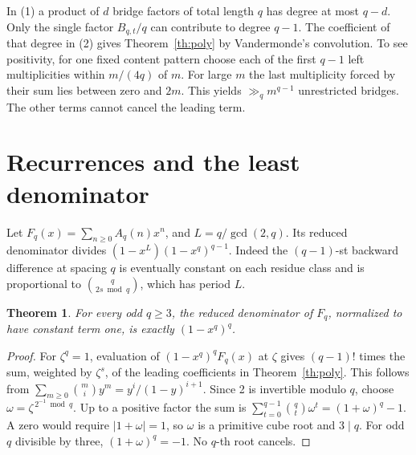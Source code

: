 \documentclass[11pt,letterpaper]{article}
\newtheorem{theorem}{Theorem}
\begin{document}
In (1) a product of \(d\) bridge factors of total length \(q\) has degree at most \(q-d\). Only the single factor \(B_{q,t}/q\) can contribute to degree \(q-1\). The coefficient of that degree in (2) gives Theorem~\ref{th:poly} by Vandermonde's convolution. To see positivity, for one fixed content pattern choose each of the first \(q-1\) left multiplicities within \(m/(4q)\) of \(m\). For large \(m\) the last multiplicity forced by their sum lies between zero and \(2m\). This yields \(\gg_q m^{q-1}\) unrestricted bridges. The other terms cannot cancel the leading term.

\section{Recurrences and the least denominator}
Let \(F_q(x)=\sum_{n\ge0}A_q(n)x^n\), and \(L=q/\gcd(2,q)\). Its reduced denominator divides \((1-x^L)(1-x^q)^{q-1}\). Indeed the \((q-1)\)-st backward difference at spacing \(q\) is eventually constant on each residue class and is proportional to \(\binom q{2s\bmod q}\), which has period \(L\).

\begin{theorem}
For every odd \(q\ge3\), the reduced denominator of \(F_q\), normalized to have constant term one, is exactly \((1-x^q)^q\).
\end{theorem}
\begin{proof}
For \(\zeta^q=1\), evaluation of \((1-x^q)^q F_q(x)\) at \(\zeta\) gives \((q-1)!\) times the sum, weighted by \(\zeta^s\), of the leading coefficients in Theorem~\ref{th:poly}. This follows from \(\sum_{m\ge0}\binom{m}{i}y^m=y^i/(1-y)^{i+1}\). Since 2 is invertible modulo \(q\), choose \(\omega=\zeta^{\,2^{-1}\bmod q}\). Up to a positive factor the sum is
\(\sum_{t=0}^{q-1}\binom qt\omega^t=(1+\omega)^q-1\).
A zero would require \(|1+\omega|=1\), so \(\omega\) is a primitive cube root and \(3\mid q\). For odd \(q\) divisible by three, \((1+\omega)^q=-1\). No \(q\)-th root cancels.
\end{proof}
\end{document}

